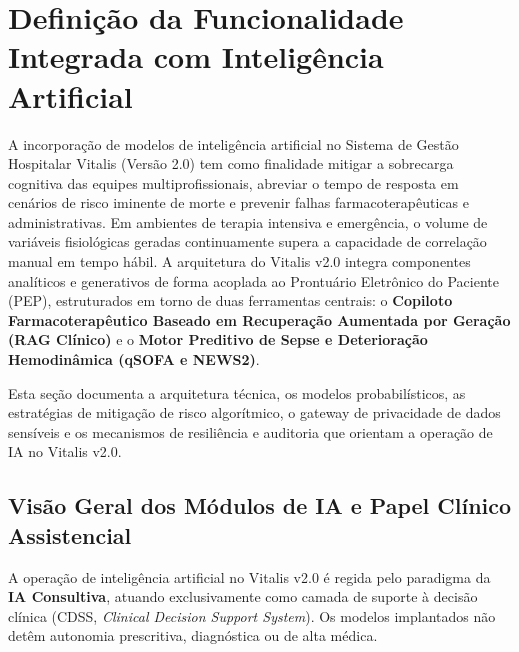 
\section{Definição da Funcionalidade Integrada com Inteligência Artificial}
\label{sec:funcionalidade_ia}

A incorporação de modelos de inteligência artificial no Sistema de Gestão Hospitalar Vitalis (Versão 2.0) tem como finalidade mitigar a sobrecarga cognitiva das equipes multiprofissionais, abreviar o tempo de resposta em cenários de risco iminente de morte e prevenir falhas farmacoterapêuticas e administrativas. Em ambientes de terapia intensiva e emergência, o volume de variáveis fisiológicas geradas continuamente supera a capacidade de correlação manual em tempo hábil. A arquitetura do Vitalis v2.0 integra componentes analíticos e generativos de forma acoplada ao Prontuário Eletrônico do Paciente (PEP), estruturados em torno de duas ferramentas centrais: o \textbf{Copiloto Farmacoterapêutico Baseado em Recuperação Aumentada por Geração (RAG Clínico)} e o \textbf{Motor Preditivo de Sepse e Deterioração Hemodinâmica (qSOFA e NEWS2)}.

Esta seção documenta a arquitetura técnica, os modelos probabilísticos, as estratégias de mitigação de risco algorítmico, o gateway de privacidade de dados sensíveis e os mecanismos de resiliência e auditoria que orientam a operação de IA no Vitalis v2.0.

\subsection{Visão Geral dos Módulos de IA e Papel Clínico Assistencial}
\label{subsec:ia_visao_geral}

A operação de inteligência artificial no Vitalis v2.0 é regida pelo paradigma da \textbf{IA Consultiva}, atuando exclusivamente como camada de suporte à decisão clínica (CDSS, \textit{Clinical Decision Support System}). Os modelos implantados não detêm autonomia prescritiva, diagnóstica ou de alta médica.

